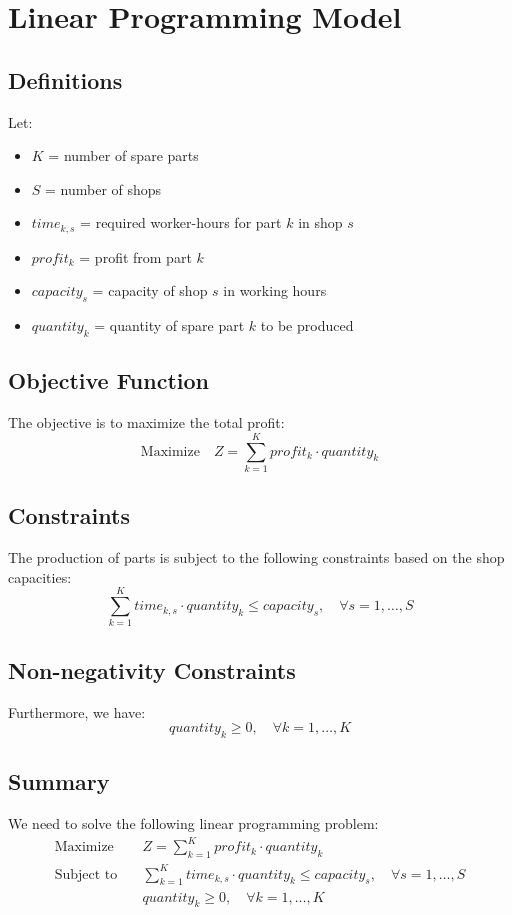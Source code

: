 \documentclass{article}
\begin{document}
\section*{Linear Programming Model}

\subsection*{Definitions}
Let:
\begin{itemize}
    \item \( K \) = number of spare parts
    \item \( S \) = number of shops
    \item \( time_{k, s} \) = required worker-hours for part \( k \) in shop \( s \)
    \item \( profit_{k} \) = profit from part \( k \)
    \item \( capacity_{s} \) = capacity of shop \( s \) in working hours
    \item \( quantity_{k} \) = quantity of spare part \( k \) to be produced
\end{itemize}

\subsection*{Objective Function}
The objective is to maximize the total profit:
\[
\text{Maximize} \quad Z = \sum_{k=1}^{K} profit_{k} \cdot quantity_{k}
\]

\subsection*{Constraints}
The production of parts is subject to the following constraints based on the shop capacities:
\[
\sum_{k=1}^{K} time_{k, s} \cdot quantity_{k} \leq capacity_{s}, \quad \forall s = 1, \ldots, S
\]

\subsection*{Non-negativity Constraints}
Furthermore, we have:
\[
quantity_{k} \geq 0, \quad \forall k = 1, \ldots, K
\]

\subsection*{Summary}
We need to solve the following linear programming problem:
\begin{align*}
\text{Maximize} & \quad Z = \sum_{k=1}^{K} profit_{k} \cdot quantity_{k} \\
\text{Subject to} & \quad \sum_{k=1}^{K} time_{k, s} \cdot quantity_{k} \leq capacity_{s}, \quad \forall s = 1, \ldots, S \\
& \quad quantity_{k} \geq 0, \quad \forall k = 1, \ldots, K
\end{align*}
\end{document}
